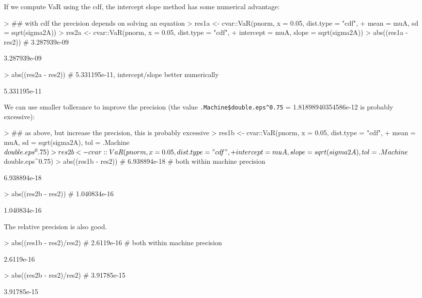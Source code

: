 \documentclass[nojss,article]{jss}
\begin{document}
If we compute VaR using the cdf, the intercept slope method has some numerical advantage:
\begin{Schunk}
\begin{Sinput}
> ## with cdf the precision depends on solving an equation
> res1a <- cvar::VaR(pnorm, x = 0.05, dist.type = "cdf",
+                    mean = muA, sd = sqrt(sigma2A))
> res2a <- cvar::VaR(pnorm, x = 0.05, dist.type = "cdf",
+                    intercept = muA, slope = sqrt(sigma2A))
> abs((res1a - res2)) # 3.287939e-09
\end{Sinput}
\begin{Soutput}
[1] 3.287939e-09
\end{Soutput}
\begin{Sinput}
> abs((res2a - res2)) # 5.331195e-11, intercept/slope better numerically
\end{Sinput}
\begin{Soutput}
[1] 5.331195e-11
\end{Soutput}
\end{Schunk}

We can use smaller tollerance to improve the precision
(the value \verb+.Machine$double.eps^0.75+ = 1.81898940354586e-12 is probably excessive):
\begin{Schunk}
\begin{Sinput}
> ## as above, but increase the precision, this is probably excessive
> res1b <- cvar::VaR(pnorm, x = 0.05, dist.type = "cdf",
+                    mean = muA, sd = sqrt(sigma2A), tol = .Machine$double.eps^0.75)
> res2b <- cvar::VaR(pnorm, x = 0.05, dist.type = "cdf",
+                    intercept = muA, slope = sqrt(sigma2A), tol = .Machine$double.eps^0.75)
> abs((res1b - res2)) # 6.938894e-18 # both within machine precision
\end{Sinput}
\begin{Soutput}
[1] 6.938894e-18
\end{Soutput}
\begin{Sinput}
> abs((res2b - res2)) # 1.040834e-16
\end{Sinput}
\begin{Soutput}
[1] 1.040834e-16
\end{Soutput}
\end{Schunk}

The relative precision is also good.
\begin{Schunk}
\begin{Sinput}
> abs((res1b - res2)/res2) # 2.6119e-16 # both within machine precision
\end{Sinput}
\begin{Soutput}
[1] 2.6119e-16
\end{Soutput}
\begin{Sinput}
> abs((res2b - res2)/res2) # 3.91785e-15
\end{Sinput}
\begin{Soutput}
[1] 3.91785e-15
\end{Soutput}
\end{Schunk}
\end{document}
